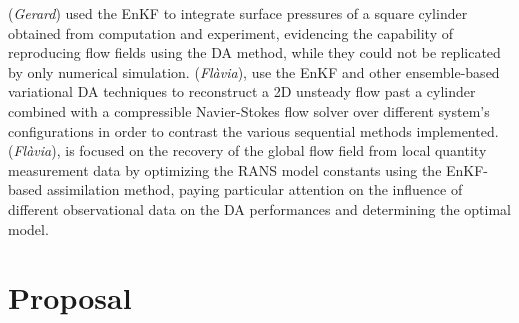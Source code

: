 \documentclass{article}
\theoremstyle{definition}
\theoremstyle{definition}
\theoremstyle{remark}
\theoremstyle{mythmstyle}
\begin{document}
\cite{kato2011hybrid} (\textit{Gerard}) used the EnKF to integrate surface pressures of a square cylinder obtained from computation and experiment, evidencing the capability of reproducing flow fields using the DA method, while they could not be replicated by only numerical simulation. %
\cite{mons2016reconstruction} (\textit{Flàvia}), use the EnKF and other ensemble-based variational DA techniques to reconstruct a 2D unsteady flow past a cylinder combined with a compressible Navier-Stokes flow solver over different system's configurations in order to contrast the various sequential methods implemented.
\cite{deng2018recovering} (\textit{Flàvia}), is focused on the recovery of the global flow field from local quantity measurement data by optimizing the RANS model constants using the EnKF-based assimilation method, paying particular attention on the influence of different observational data on the DA performances and determining the optimal model. 

\section{Proposal}
\end{document}
